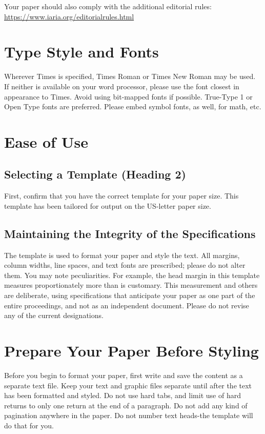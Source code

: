 \documentclass[conference,pbalance]{iaria}
\begin{document}
Your paper should also comply with the additional  editorial rules:
\url{https://www.iaria.org/editorialrules.html} \faWarning{}

\section{Type Style and Fonts}
Wherever Times is specified, Times Roman or Times New Roman may be used. If neither is available on your word processor, please use the font closest in appearance to Times. Avoid using bit-mapped fonts if possible. True-Type 1 or Open Type fonts are preferred. Please embed symbol fonts, as well, for math, etc.

\section{Ease of Use}

\subsection{Selecting a Template (Heading 2)}
First, confirm that you have the correct template for your paper size. This template has been tailored for output on the US-letter paper size.

\subsection{Maintaining the Integrity of the Specifications}
The template is used to format your paper and style the text. All margins, column widths, line spaces, and text fonts are prescribed; please do not alter them. You may note peculiarities. For example, the head margin in this template measures proportionately more than is customary. This measurement and others are deliberate, using specifications that anticipate your paper as one part of the entire proceedings, and not as an independent document. Please do not revise any of the current designations.

\section{Prepare Your Paper Before Styling}

Before you begin to format your paper, first write and save the content as a separate text file. Keep your text and graphic files separate until after the text has been formatted and styled. Do not use hard tabs, and limit use of hard returns to only one return at the end of a paragraph. Do not add any kind of pagination anywhere in the paper. Do not number text heads-the template will do that for you.
\end{document}
